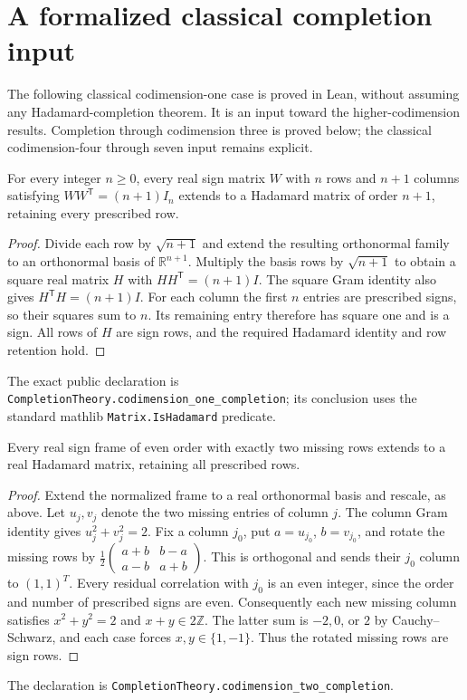\section{A formalized classical completion input}
The following classical codimension-one case is proved in Lean, without
assuming any Hadamard-completion theorem. It is an input toward the
higher-codimension results. Completion through codimension three is proved
below; the classical codimension-four through seven input remains explicit.
\begin{theorem}
For every integer $n\ge0$, every real sign matrix $W$ with $n$ rows and
$n+1$ columns satisfying $WW^{\mathsf T}=(n+1)I_n$ extends to a Hadamard
matrix of order $n+1$, retaining every prescribed row.
\end{theorem}
\begin{proof}
Divide each row by $\sqrt{n+1}$ and extend the resulting orthonormal
family to an orthonormal basis of $\mathbb R^{n+1}$. Multiply the basis
rows by $\sqrt{n+1}$ to obtain a square real matrix $H$ with
$HH^{\mathsf T}=(n+1)I$. The square Gram identity also gives
$H^{\mathsf T}H=(n+1)I$. For each column the first $n$ entries are
prescribed signs, so their squares sum to $n$. Its remaining entry
therefore has square one and is a sign. All rows of $H$ are sign rows,
and the required Hadamard identity and row retention hold.
\end{proof}
The exact public declaration is
\texttt{CompletionTheory.codimension\_one\_completion}; its conclusion
uses the standard mathlib \texttt{Matrix.IsHadamard} predicate.

\begin{theorem}
Every real sign frame of even order with exactly two missing rows extends
to a real Hadamard matrix, retaining all prescribed rows.
\end{theorem}
\begin{proof}
Extend the normalized frame to a real orthonormal basis and rescale, as
above. Let $u_j,v_j$ denote the two missing entries of column $j$.
The column Gram identity gives $u_j^2+v_j^2=2$. Fix a column $j_0$,
put $a=u_{j_0}$, $b=v_{j_0}$, and rotate the missing rows by
$\frac12\left(\begin{smallmatrix}a+b&b-a\\a-b&a+b\end{smallmatrix}\right)$.
This is orthogonal and sends their $j_0$ column to $(1,1)^T$.
Every residual correlation with $j_0$ is an even integer, since the
order and number of prescribed signs are even. Consequently each
new missing column satisfies $x^2+y^2=2$ and $x+y\in2\mathbb Z$.
The latter sum is $-2,0$, or $2$ by Cauchy--Schwarz, and each case
forces $x,y\in\{1,-1\}$. Thus the rotated missing rows are sign rows.
\end{proof}
The declaration is \texttt{CompletionTheory.codimension\_two\_completion}.

